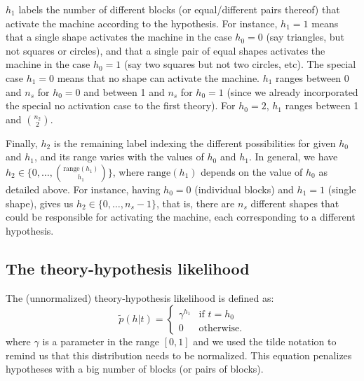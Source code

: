 \documentclass[11pt, a4paper]{article}
\begin{document}
$h_1$ labels the number of different blocks (or equal/different pairs thereof) that activate the machine according to the hypothesis. For instance, $h_1=1$ means that a single shape activates the machine in the case $h_0=0$ (say triangles, but not squares or circles), and that a single pair of equal shapes activates the machine in the case $h_0=1$ (say two squares but not two circles, etc). The special case $h_1=0$ means that no shape can activate the machine. $h_1$ ranges between 0 and $n_s$ for $h_0=0$ and between 1 and $n_s$ for $h_0=1$ (since we already incorporated the special no activation case to the first theory). For $h_0=2$, $h_1$ ranges between 1 and $n_2 \choose 2$.

Finally, $h_2$ is the remaining label indexing the different possibilities for given $h_0$ and $h_1$, and its range varies with the values of $h_0$ and $h_1$. In general, we have $h_2\in\{0, \ldots, {\textrm{range}(h_1) \choose h_1 }\}$, where $\textrm{range}(h_1)$ depends on the value of $h_0$ as detailed above. For instance, having $h_0=0$ (individual blocks) and $h_1=1$ (single shape), gives us $h_2\in\{0, \ldots, n_s-1\}$, that is, there are $n_s$ different shapes that could be responsible for activating the machine, each corresponding to a different hypothesis. 

\subsection*{The theory-hypothesis likelihood}
The (unnormalized) theory-hypothesis likelihood is defined as:
\begin{equation}
\tilde{p}(h|t)=
\begin{cases}
\gamma^{h_1} & \mbox{if } t=h_0 \\ 
0 & \mbox{otherwise}.
\end{cases}
\end{equation}
where $\gamma$ is a parameter in the range $[0,1]$ and we used the tilde notation to remind us that this distribution needs to be normalized. This equation penalizes hypotheses with a big number of blocks (or pairs of blocks).
\end{document}
